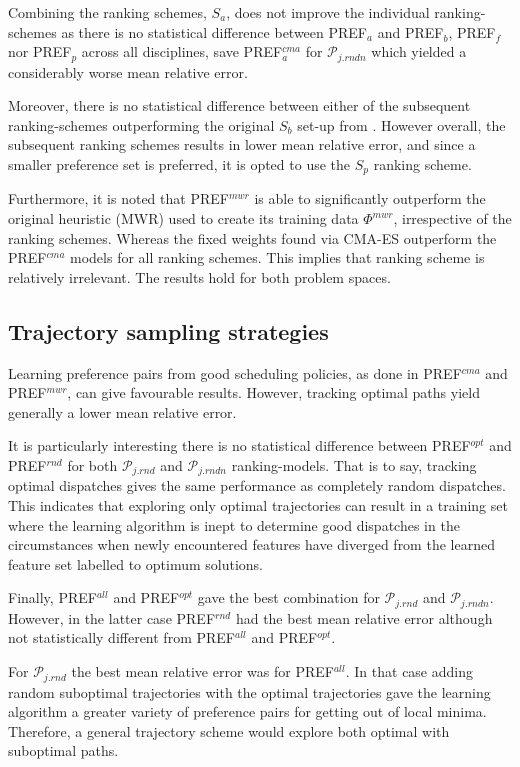 \documentclass[smallextended]{llncs}
\newcommand{\PREF}[2]{PREF$_{#2}^{#1}$}
\begin{document}
Combining the ranking schemes, $S_{a}$, does not improve the individual ranking-schemes as there is no statistical difference between \PREF{}{a} and \PREF{}{b}, \PREF{}{f} nor \PREF{}{p}  across all  disciplines, save \PREF{cma}{a} for $\mathcal{P}_{j.rndn}$ which yielded a considerably worse mean relative error. 

Moreover, there is no statistical difference between either of the subsequent ranking-schemes outperforming the original $S_b$ set-up from \cite{InRu11a}. However overall, the subsequent ranking schemes results in lower mean relative error, and since a smaller preference set is preferred, it is opted to use the $S_{p}$ ranking scheme. 

Furthermore, it is noted that \PREF{mwr}{}  is able to significantly outperform the original heuristic (MWR) used to create its training data $\Phi^{mwr}$, irrespective of the ranking schemes. Whereas the fixed weights found via CMA-ES outperform the \PREF{cma}{} models for all ranking schemes. This implies that ranking scheme is relatively irrelevant. The results hold for both problem spaces. 

\subsection{Trajectory sampling strategies}\label{sec:expr:track}
Learning preference pairs from  good scheduling policies, as done  in \PREF{cma}{} and \PREF{mwr}{}, can give favourable results. However, tracking optimal paths yield generally a lower mean relative error. 

It is particularly interesting there is no statistical difference between \PREF{opt}{} and \PREF{rnd}{} for both 
$\mathcal{P}_{j.rnd}$ and $\mathcal{P}_{j.rndn}$ ranking-models. That is to say, tracking optimal dispatches gives the same performance as completely random dispatches. This indicates that exploring 
only optimal trajectories can result in a training set where the learning algorithm is inept to determine good 
dispatches in the circumstances when newly encountered features have diverged from the learned feature set labelled to optimum solutions. 

Finally, \PREF{all}{} and \PREF{opt}{} gave the best combination for $\mathcal{P}_{j.rnd}$ and $\mathcal{P}_{j.rndn}$. However, in the latter case \PREF{rnd}{} had the best mean relative error although not statistically different from \PREF{all}{} and \PREF{opt}{}.

For $\mathcal{P}_{j.rnd}$  the best mean relative error was for \PREF{all}{}. In that case adding random suboptimal trajectories with the optimal trajectories gave the learning algorithm a greater variety of preference pairs for getting out of local minima. Therefore, a general trajectory scheme would explore both optimal with suboptimal paths.
\end{document}
